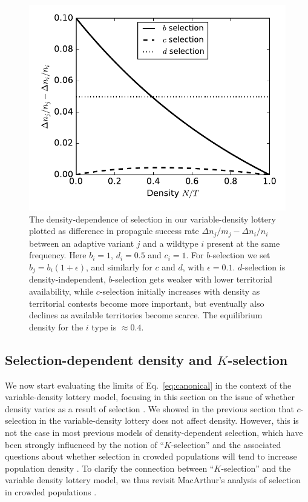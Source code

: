 \documentclass[12pt]{article}
\begin{document}
\begin{figure}
\centering
\includegraphics[scale=0.8]{DDS_lottery.pdf}
\caption{\label{fig:DDS_lottery} The density-dependence of selection in our variable-density lottery plotted as difference in propagule success rate $\Delta n_j/m_j-\Delta n_i/n_i$ between an adaptive variant $j$ and a wildtype $i$ present at the same frequency. Here $b_i=1$, $d_i=0.5$ and $c_i=1$. For $b$-selection we set $b_j=b_i(1+\epsilon)$, and similarly for $c$ and $d$, with $\epsilon=0.1$. $d$-selection is density-independent, $b$-selection gets weaker with lower territorial availability, while $c$-selection initially increases with density as territorial contests become more important, but eventually also declines as  available territories become scarce. The equilibrium density for the $i$ type is $\approx 0.4$.}
\end{figure}

\subsection*{Selection-dependent density and $K$-selection}

We now start evaluating the limits of Eq.~\eqref{eq:canonical} in the context of the variable-density lottery model, focusing in this section on the issue of whether density varies as a result of selection \citep{prout_1980}. We showed in the previous section that $c$-selection in the variable-density lottery does not affect density. 
However, this is not the case in most previous models of density-dependent selection, which have been strongly influenced by the notion of ``$K$-selection'' and the associated questions about whether selection in crowded populations will tend to increase population density \citep{anderson_1971,roughgarden_1979,lande_2009}. To clarify the connection between ``$K$-selection'' and the variable density lottery model, we thus revisit MacArthur's analysis of selection in crowded populations \citep{macarthur_1967}.
\end{document}
